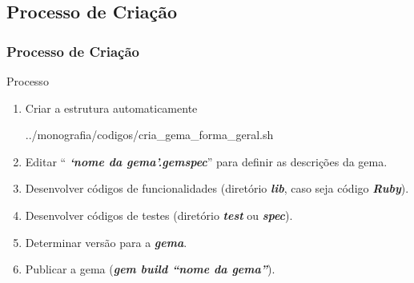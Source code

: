 \subsection{Processo de Criação}
\begin{frame}
 \frametitle{Processo de Criação}

  \begin{block}{Processo}

    \begin{enumerate}

     \item Criar a estrutura automaticamente

      
      {../monografia/codigos/cria_gema_forma_geral.sh}

     \item Editar ``\emph{\textbf{ `nome da gema'.gemspec}}'' para definir as descrições da gema.

     \item Desenvolver códigos de funcionalidades (diretório \emph{\textbf{lib}}, caso seja código \emph{\textbf{Ruby}}).

     \item Desenvolver códigos de testes (diretório \emph{\textbf{test}} ou \emph{\textbf{spec}}).
     
     \item Determinar versão para a \emph{\textbf{gema}}.
     
     \item Publicar a gema (\emph{\textbf{gem build ``nome da gema''}}).

    \end{enumerate}

  \end{block}

\end{frame}


